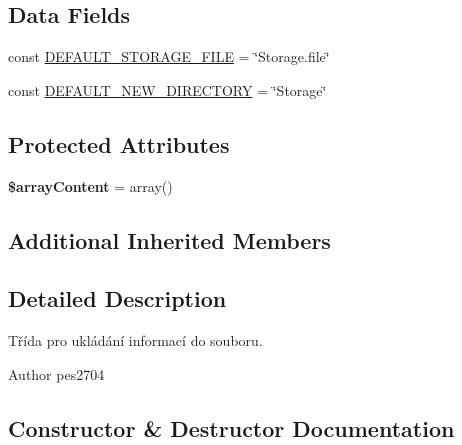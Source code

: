 \subsection*{Data Fields}
\begin{DoxyCompactItemize}
\item 
const \mbox{\hyperlink{class_pes_1_1_storage_1_1_array_file_afc1a2b640017c3b11284ed24451cef33}{D\+E\+F\+A\+U\+L\+T\+\_\+\+S\+T\+O\+R\+A\+G\+E\+\_\+\+F\+I\+LE}} = \char`\"{}Storage.\+file\char`\"{}
\item 
const \mbox{\hyperlink{class_pes_1_1_storage_1_1_array_file_a9680694d8b7e30c9c288a50b2b4df306}{D\+E\+F\+A\+U\+L\+T\+\_\+\+N\+E\+W\+\_\+\+D\+I\+R\+E\+C\+T\+O\+RY}} = \char`\"{}Storage\char`\"{}
\end{DoxyCompactItemize}
\subsection*{Protected Attributes}
\begin{DoxyCompactItemize}
\item 
\mbox{\label{class_pes_1_1_storage_1_1_array_file_a4f0ce3c113b9995166f361d8d7a2b1e2}} 
{\bfseries \$array\+Content} = array()
\end{DoxyCompactItemize}
\subsection*{Additional Inherited Members}


\subsection{Detailed Description}
Třída pro ukládání informací do souboru.

\begin{DoxyAuthor}{Author}
pes2704 
\end{DoxyAuthor}


\subsection{Constructor \& Destructor Documentation}
\mbox{\label{class_pes_1_1_storage_1_1_array_file_a421831a265621325e1fdd19aace0c758}} 
